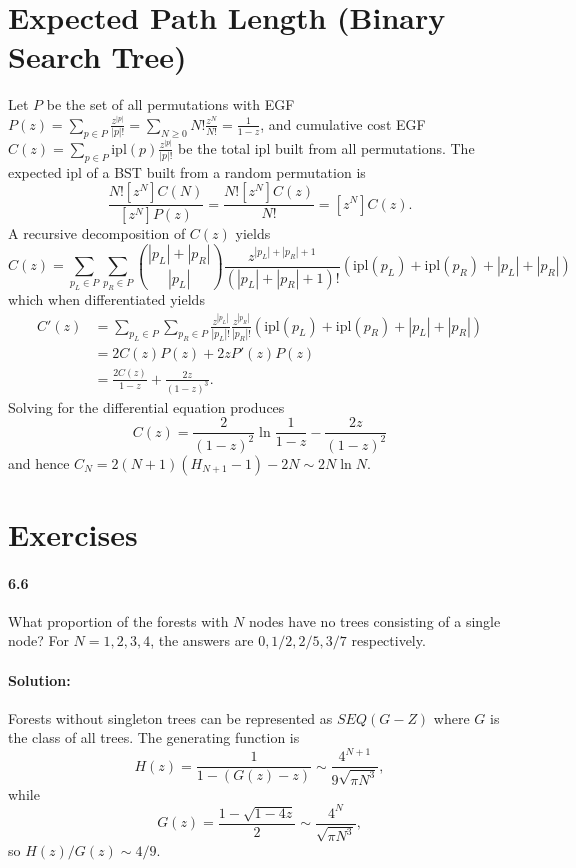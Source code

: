 \documentclass{article}
\begin{document}
\section{Expected Path Length (Binary Search Tree)}

Let $P$ be the set of all permutations with EGF $P(z) = \sum_{p \in P}
\frac{z^{|p|}}{|p|!} = \sum_{N \geq 0} N!\frac{z^N}{N!} = \frac{1}{1 - z}$, and
cumulative cost EGF $C(z) = \sum_{p \in P} \mathrm{ipl}(p)\frac{z^{|p|}}{|p|!}$
be the total ipl built from all permutations. The expected ipl of a BST built
from a random permutation is \begin{equation*}
  \frac{N![z^N]C(N)}{[z^N]P(z)} = \frac{N![z^N]C(z)}{N!} = [z^N]C(z).
\end{equation*} A recursive decomposition of $C(z)$ yields \begin{equation*}
  C(z) = \sum_{p_L \in P} \sum_{p_R \in P} \binom{|p_L| + |p_R|}{|p_L|}
    \frac{z^{|p_L| + |p_R| + 1}}{(|p_L| + |p_R| + 1)!} (\mathrm{ipl}(p_L) +
    \mathrm{ipl}(p_R) + |p_L| + |p_R|)
\end{equation*} which when differentiated yields \begin{align*}
  C'(z) &= \sum_{p_L \in P} \sum_{p_R \in P} \frac{z^{|p_L|}}{|p_L|!}
    \frac{z^{|p_R|}}{|p_R|!}(\mathrm{ipl}(p_L) + \mathrm{ipl}(p_R) + |p_L| +
    |p_R|) \\
        &= 2C(z)P(z) + 2zP'(z)P(z) \\
        &= \frac{2C(z)}{1 - z} + \frac{2z}{(1 - z)^3}.
\end{align*} Solving for the differential equation produces \begin{equation*}
  C(z) = \frac{2}{(1 - z)^2}\ln\frac{1}{1 - z} - \frac{2z}{(1 - z)^2}
\end{equation*} and hence $C_N = 2(N + 1)(H_{N + 1} - 1) - 2N \sim 2N\ln N$.

\section*{Exercises}

\paragraph{6.6} What proportion of the forests with $N$ nodes have no trees
consisting of a single node? For $N = 1, 2, 3, 4$, the answers are
$0, 1/2, 2/5, 3/7$ respectively.

\paragraph{Solution:} Forests without singleton trees can be represented as
$SEQ(G - Z)$ where $G$ is the class of all trees. The generating function is
\begin{equation*}
  H(z) = \frac{1}{1 - (G(z) - z)} \sim \frac{4^{N + 1}}{9\sqrt{\pi N^3}},
\end{equation*} while \begin{equation*}
  G(z) = \frac{1 - \sqrt{1 - 4z}}{2} \sim \frac{4^N}{\sqrt{\pi N^3}},
\end{equation*} so $H(z)/G(z) \sim 4/9$.
\end{document}
